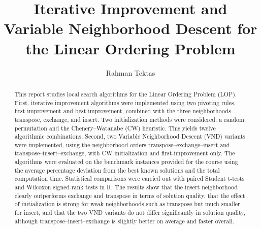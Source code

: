 \documentclass[sigconf,nonacm]{acmart}
\begin{document}
\title{
	{Iterative Improvement and Variable Neighborhood Descent for the Linear Ordering Problem}
}

\author{Rahman Tektas}
 




\begin{abstract}
This report studies local search algorithms for the Linear Ordering Problem (LOP). First, iterative improvement algorithms were implemented using two pivoting rules, first-improvement and best-improvement, combined with the three neighborhoods transpose, exchange, and insert. Two initialization methods were considered: a random permutation and the Chenery–Watanabe (CW) heuristic. This yields twelve algorithmic combinations. Second, two Variable Neighborhood Descent (VND) variants were implemented, using the neighborhood orders transpose–exchange–insert and transpose–insert–exchange, with CW initialization and first-improvement only. The algorithms were evaluated on the benchmark instances provided for the course using the average percentage deviation from the best known solutions and the total computation time. Statistical comparisons were carried out with paired Student t-tests and Wilcoxon signed-rank tests in R\cite{Rsoftware}. 
The results show that the insert neighborhood clearly outperforms exchange and transpose in terms of solution quality, that the effect of initialization is strong for weak neighborhoods such as transpose but much smaller for insert, and that the two VND variants do not differ significantly in solution quality, although transpose--insert--exchange is slightly better on average and faster overall.
\end{abstract}

\maketitle





 



\end{document}
